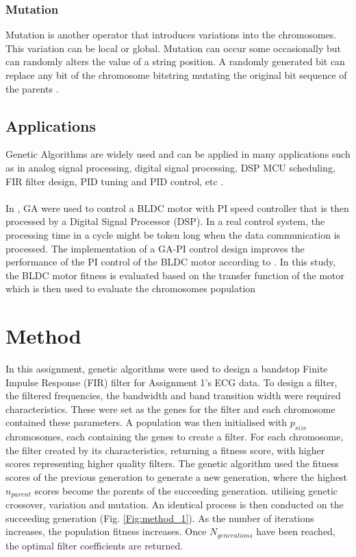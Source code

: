 \documentclass[a4paper, 11pt]{article}
\begin{document}
        \subsubsection{Mutation}
            Mutation is another operator that introduces variations into the chromosomes. This variation can be
            local or global. Mutation can occur some occasionally but can randomly alters the value of a string
            position. A randomly generated bit can replace any bit of the chromosome bitstring mutating the original
            bit sequence of the parents \cite{Tang1996}.

        \subsection{Applications}
        Genetic Algorithms are widely used and can be applied in many applications such as in analog signal processing, 
        digital signal processing, DSP MCU scheduling, FIR filter design, PID tuning and PID control, etc 
        \cite{Chen2017, Fleming1993, Cao2012, Fabijanski2008, Miyata2018, Amphlett1996}.
        \\\\
        In \cite{Chen2017}, GA were used to control a BLDC motor with PI speed controller that is then processed by 
        a Digital Signal Processor (DSP). In a real control system, the processing time in a cycle might be token long
        when the data communication is processed. The implementation of a GA-PI control design improves the performance of
        the PI control of the BLDC motor according to \cite{Chen2017}. In this study, the BLDC motor fitness is evaluated
        based on the transfer function of the motor which is then used to evaluate the chromosomes population 


\section{Method}\label{sec:meth}
    In this assignment, genetic algorithms were used to design a bandstop Finite Impulse Response (FIR) filter for Assignment 1's 
    ECG data. To design a filter, the filtered frequencies, the bandwidth and band transition width  were required 
    characteristics. These were set as the genes for the filter and each chromosome contained these parameters.
    A population was then initialised with $p_{size}$ chromosomes, each containing the genes to create a filter. 
    For each chromosome, the filter created by its characteristics, returning a fitness score, with higher scores 
    representing higher quality filters. The genetic algorithm used the fitness scores of the previous generation
    to generate a new generation, where the highest $n_{parent}$ scores become the parents of the succeeding generation. 
    utilising genetic crossover, variation and mutation. An identical process is then conducted on the succeeding generation (Fig. \ref{Fig:method_1}). 
    As the number of iterations increases, the population fitness increases. Once $N_{generations}$ have been reached, the
    optimal filter coefficients are returned. 
\end{document}
